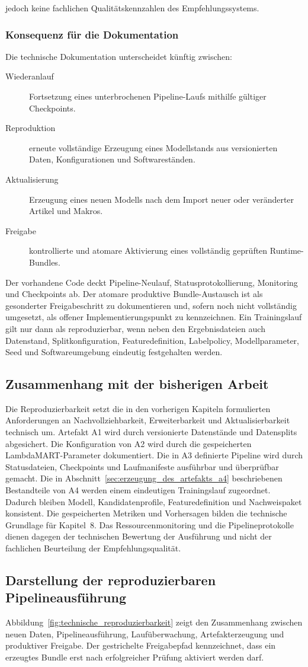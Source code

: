 jedoch keine fachlichen Qualitätskennzahlen des Empfehlungssystems. \subsubsection*{Konsequenz für die Dokumentation} Die technische Dokumentation unterscheidet künftig zwischen: \begin{description} \item[Wiederanlauf] Fortsetzung eines unterbrochenen Pipeline-Laufs mithilfe gültiger Checkpoints. \item[Reproduktion] erneute vollständige Erzeugung eines Modellstands aus versionierten Daten, Konfigurationen und Softwareständen. \item[Aktualisierung] Erzeugung eines neuen Modells nach dem Import neuer oder veränderter Artikel und Makros. \item[Freigabe] kontrollierte und atomare Aktivierung eines vollständig geprüften Runtime-Bundles. \end{description} Der vorhandene Code deckt Pipeline-Neulauf, Statusprotokollierung, Monitoring und Checkpoints ab. Der atomare produktive Bundle-Austausch ist als gesonderter Freigabeschritt zu dokumentieren und, sofern noch nicht vollständig umgesetzt, als offener Implementierungspunkt zu kennzeichnen. Ein Trainingslauf gilt nur dann als reproduzierbar, wenn neben den Ergebnisdateien auch Datenstand, Splitkonfiguration, Featuredefinition, Labelpolicy, Modellparameter, Seed und Softwareumgebung eindeutig festgehalten werden. \subsection{Zusammenhang mit der bisherigen Arbeit} \label{subsec:zusammenhang_reproduzierbarkeit} Die Reproduzierbarkeit setzt die in den vorherigen Kapiteln formulierten Anforderungen an Nachvollziehbarkeit, Erweiterbarkeit und Aktualisierbarkeit technisch um. Artefakt A1 wird durch versionierte Datenstände und Datensplits abgesichert. Die Konfiguration von A2 wird durch die gespeicherten LambdaMART-Parameter dokumentiert. Die in A3 definierte Pipeline wird durch Statusdateien, Checkpoints und Laufmanifeste ausführbar und überprüfbar gemacht. Die in Abschnitt~\ref{sec:erzeugung_des_artefakts_a4} beschriebenen Bestandteile von A4 werden einem eindeutigen Trainingslauf zugeordnet. Dadurch bleiben Modell, Kandidatenprofile, Featuredefinition und Nachweispaket konsistent. Die gespeicherten Metriken und Vorhersagen bilden die technische Grundlage für Kapitel~8. Das Ressourcenmonitoring und die Pipelineprotokolle dienen dagegen der technischen Bewertung der Ausführung und nicht der fachlichen Beurteilung der Empfehlungsqualität. \subsection{Darstellung der reproduzierbaren Pipelineausführung} \label{subsec:darstellung_reproduzierbare_pipelineausfuehrung} Abbildung~\ref{fig:technische_reproduzierbarkeit} zeigt den Zusammenhang zwischen neuen Daten, Pipelineausführung, Laufüberwachung, Artefakterzeugung und produktiver Freigabe. Der gestrichelte Freigabepfad kennzeichnet, dass ein erzeugtes Bundle erst nach erfolgreicher Prüfung aktiviert werden darf. 
